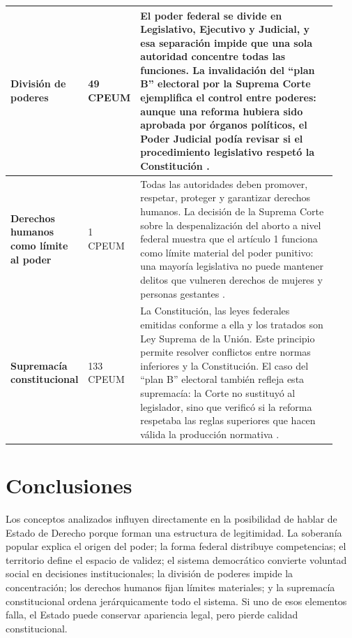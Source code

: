 \documentclass[
	spanish,
	letterpaper, oneside
]{article}
\begin{document}
\begin{longtable}{@{}p{0.19\linewidth}p{0.13\linewidth}p{0.61\linewidth}@{}}
\textbf{División de poderes} &
49 CPEUM &
El poder federal se divide en Legislativo, Ejecutivo y Judicial, y esa separación impide que una sola autoridad concentre todas las funciones. La invalidación del ``plan B'' electoral por la Suprema Corte ejemplifica el control entre poderes: aunque una reforma hubiera sido aprobada por órganos políticos, el Poder Judicial podía revisar si el procedimiento legislativo respetó la Constitución \citep{elpaisPlanB2023}. \\
\midrule

\textbf{Derechos humanos como límite al poder} &
1 CPEUM &
Todas las autoridades deben promover, respetar, proteger y garantizar derechos humanos. La decisión de la Suprema Corte sobre la despenalización del aborto a nivel federal muestra que el artículo 1 funciona como límite material del poder punitivo: una mayoría legislativa no puede mantener delitos que vulneren derechos de mujeres y personas gestantes \citep{expansionAborto2023}. \\
\midrule

\textbf{Supremacía constitucional} &
133 CPEUM &
La Constitución, las leyes federales emitidas conforme a ella y los tratados son Ley Suprema de la Unión. Este principio permite resolver conflictos entre normas inferiores y la Constitución. El caso del ``plan B'' electoral también refleja esta supremacía: la Corte no sustituyó al legislador, sino que verificó si la reforma respetaba las reglas superiores que hacen válida la producción normativa \citep{elpaisPlanB2023}. \\

\end{longtable}
\endgroup

\section{Conclusiones}

Los conceptos analizados influyen directamente en la posibilidad de hablar de Estado de Derecho porque forman una estructura de legitimidad. La soberanía popular explica el origen del poder; la forma federal distribuye competencias; el territorio define el espacio de validez; el sistema democrático convierte voluntad social en decisiones institucionales; la división de poderes impide la concentración; los derechos humanos fijan límites materiales; y la supremacía constitucional ordena jerárquicamente todo el sistema. Si uno de esos elementos falla, el Estado puede conservar apariencia legal, pero pierde calidad constitucional.
\end{document}
